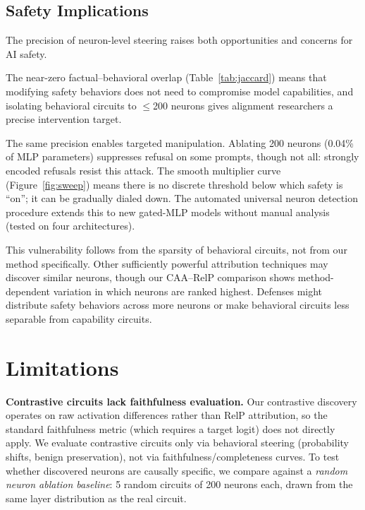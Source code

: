 \documentclass[11pt]{article}
\begin{document}
\subsection{Safety Implications}

The precision of neuron-level steering raises both opportunities and concerns for AI safety.

The near-zero factual--behavioral overlap (Table~\ref{tab:jaccard}) means that modifying safety behaviors does not need to compromise model capabilities, and isolating behavioral circuits to $\leq$200 neurons gives alignment researchers a precise intervention target.

The same precision enables targeted manipulation.
Ablating 200 neurons (0.04\% of MLP parameters) suppresses refusal on some prompts, though not all: strongly encoded refusals resist this attack.
The smooth multiplier curve (Figure~\ref{fig:sweep}) means there is no discrete threshold below which safety is ``on''; it can be gradually dialed down.
The automated universal neuron detection procedure extends this to new gated-MLP models without manual analysis (tested on four architectures).

This vulnerability follows from the sparsity of behavioral circuits, not from our method specifically.
Other sufficiently powerful attribution techniques may discover similar neurons, though our CAA--RelP comparison shows method-dependent variation in which neurons are ranked highest.
Defenses might distribute safety behaviors across more neurons or make behavioral circuits less separable from capability circuits.


\section{Limitations}
\label{sec:limitations}

\textbf{Contrastive circuits lack faithfulness evaluation.}
Our contrastive discovery operates on raw activation differences rather than RelP attribution, so the standard faithfulness metric (which requires a target logit) does not directly apply.
We evaluate contrastive circuits only via behavioral steering (probability shifts, benign preservation), not via faithfulness/completeness curves.
To test whether discovered neurons are causally specific, we compare against a \emph{random neuron ablation baseline}: 5 random circuits of 200 neurons each, drawn from the same layer distribution as the real circuit.
\end{document}
